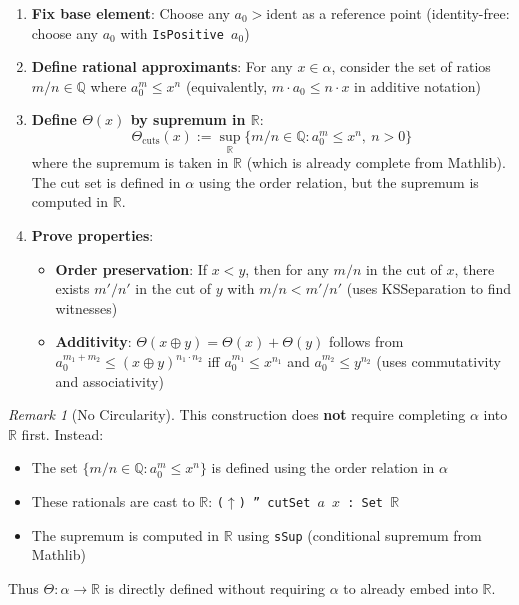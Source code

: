 \documentclass[11pt]{article}
\theoremstyle{definition}
\theoremstyle{remark}
\newtheorem{remark}[theorem]{Remark}
\begin{document}
\begin{enumerate}
\item \textbf{Fix base element}: Choose any $a_0 > \text{ident}$ as a reference point (identity-free: choose any $a_0$ with \texttt{IsPositive $a_0$})

\item \textbf{Define rational approximants}: For any $x \in \alpha$, consider the set of ratios $m/n \in \mathbb{Q}$
where $a_0^m \leq x^n$ (equivalently, $m \cdot a_0 \leq n \cdot x$ in additive notation)

\item \textbf{Define $\Theta(x)$ by supremum in $\mathbb{R}$}:
\[ \Theta_{\text{cuts}}(x) := \sup_{\mathbb{R}} \{ m/n \in \mathbb{Q} : a_0^m \leq x^n,\ n > 0 \} \]
where the supremum is taken in $\mathbb{R}$ (which is already complete from Mathlib).
The cut set is defined in $\alpha$ using the order relation, but the supremum is computed in $\mathbb{R}$.

\item \textbf{Prove properties}:
\begin{itemize}
\item \textbf{Order preservation}: If $x < y$, then for any $m/n$ in the cut of $x$, there exists
      $m'/n'$ in the cut of $y$ with $m/n < m'/n'$ (uses KSSeparation to find witnesses)
\item \textbf{Additivity}: $\Theta(x \oplus y) = \Theta(x) + \Theta(y)$ follows from
      $a_0^{m_1+m_2} \leq (x \oplus y)^{n_1 \cdot n_2}$ iff $a_0^{m_1} \leq x^{n_1}$ and $a_0^{m_2} \leq y^{n_2}$
      (uses commutativity and associativity)
\end{itemize}
\end{enumerate}

\begin{remark}[No Circularity]
This construction does \textbf{not} require completing $\alpha$ into $\mathbb{R}$ first.
Instead:
\begin{itemize}
\item The set $\{ m/n \in \mathbb{Q} : a_0^m \leq x^n \}$ is defined using the order relation in $\alpha$
\item These rationals are cast to $\mathbb{R}$: \texttt{($\uparrow$) '' cutSet $a$ $x$ : Set $\mathbb{R}$}
\item The supremum is computed in $\mathbb{R}$ using \texttt{sSup} (conditional supremum from Mathlib)
\end{itemize}
Thus $\Theta : \alpha \to \mathbb{R}$ is directly defined without requiring $\alpha$ to already embed into $\mathbb{R}$.
\end{remark}
\end{document}
